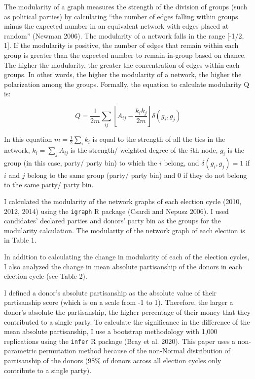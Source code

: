 \documentclass[12pt,]{article}
\begin{document}
The modularity of a graph measures the strength of the division of
groups (such as political parties) by calculating ``the number of edges
falling within groups minus the expected number in an equivalent network
with edges placed at random'' (Newman 2006). The modularity of a network
falls in the range {[}-1/2, 1{]}. If the modularity is positive, the
number of edges that remain within each group is greater than the
expected number to remain in-group based on chance. The higher the
modularity, the greater the concentration of edges within each groups.
In other words, the higher the modularity of a network, the higher the
polarization among the groups. Formally, the equation to calculate
modularity Q is:

\[Q = \frac{1}{2m} \sum_{ij}\left[A_{ij} - \frac{k_{i}k_{j}}{2m} \right]\delta(g_{i},g_{j})\]

In this equation \(m = \frac{1}{2}\sum_{i}k_{i}\) is equal to the
strength of all the ties in the network, \(k_{i}=\sum_{j}A_{ij}\) is the
strength/ weighted degree of the \(i\)th node, \(g_{i}\) is the group
(in this case, party/ party bin) to which the \(i\) belong, and
\(\delta(g_{i},g_{j}) = 1\) if \(i\) and \(j\) belong to the same group
(party/ party bin) and 0 if they do not belong to the same party/ party
bin.

I calculated the modularity of the network graphs of each election cycle
(2010, 2012, 2014) using the \texttt{igraph} R package (Csardi and
Nepusz 2006). I used candidates' declared parties and donors' party bin
as the groups for the modularity calculation. The modularity of the
network graph of each election is in Table 1.

In addition to calculating the change in modularity of each of the
election cycles, I also analyzed the change in mean absolute
partisanship of the donors in each election cycle (see Table 2).

I defined a donor's absolute partisanship as the absolute value of their
partisanship score (which is on a scale from -1 to 1). Therefore, the
larger a donor's absolute the partisanship, the higher percentage of
their money that they contributed to a single party. To calculate the
significance in the difference of the mean absolute partisanship, I use
a bootstrap methodology with 1,000 replications using the \texttt{infer}
R package (Bray et al. 2020). This paper uses a non-parametric
permutation method because of the non-Normal distribution of
partisanship of the donors (98\% of donors across all election cycles
only contribute to a single party).
\end{document}
